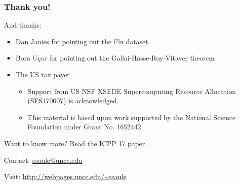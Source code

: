 \documentclass{beamer}
\begin{document}
\begin{frame}
  \frametitle{Thank you!}

  And thanks:
  \begin{itemize}
  \item Dan Janies for pointing out the Flu dataset
  \item Bora U\c{c}ar for pointing out the Gallai-Hasse-Roy-Vitaver theorem
  \item The US tax payer
    \begin{itemize}
    \item Support from US NSF XSEDE Supercomputing Resource Allocation (SES170007) is acknowledged.
    \item This material is based upon work supported by the National Science Foundation under Grant No. 1652442.
    \end{itemize}
  \end{itemize}

  \begin{block}{Want to know more?}
    Read the ICPP 17 paper.

    Contact: \url{esaule@uncc.edu}

    Visit: \url{http://webpages.uncc.edu/~esaule}
  \end{block}
\end{frame}



\end{document}
